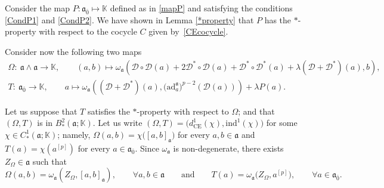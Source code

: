 \documentclass[pdftex]{sigma}
\numberwithin{equation}{section}
\begin{document}
Consider the map $ P\colon\mathfrak{a}_{\bar 0} \mapsto \mathbb{K} $ defined as in \eqref{mapP} and
satisfying the conditions \eqref{CondP1} and \eqref{CondP2}. We have shown in Lemma \ref{*property} that $P$ has the $*$-property with respect to the cocycle $C$ given by~\eqref{CEcocycle}.

Consider now the following two
maps
\begin{gather*}
\Omega\colon\ \mathfrak{a}\wedge \mathfrak{a} \rightarrow \mathbb K, \qquad (a,b) \mapsto \omega_\mathfrak{a}( {\mathscr D} \circ {\mathscr D}(a) + 2 {\mathscr D}^* \circ {\mathscr D}(a)+ {\mathscr D}^* \circ {\mathscr D}^*(a) +\lambda ( {\mathscr D} + {\mathscr D} ^* )(a) , b) , \\
T\colon\ \mathfrak{a}_{\bar 0} \rightarrow \mathbb K, \qquad a \mapsto \omega_\mathfrak{a}(({\mathscr D}+{\mathscr D}^*)(a),\bigl(\mathrm{ad}_a^\mathfrak{a}\bigr)^{p-2}({\mathscr D}(a)))+\lambda P(a).
\end{gather*}

Let us suppose that $T$ satisfies the $*$-property with respect to $\Omega$; and that $(\Omega, T)$ is in $B^2_*(\mathfrak{a};\mathbb{K})$.
Let us write $(\Omega, T)= \bigl(d^1_{\mathrm{CE}} (\chi), \mathrm{ind}^1(\chi) \bigr)$ for some $\chi\in C^1_*(\mathfrak{a}; \mathbb{K})$; namely, $\Omega(a,b)=\chi\bigl([a,b]_\mathfrak{a}\bigr)$ for every $a,b\in \mathfrak{a}$ and $T(a)=\chi(a^{[p]})$ for every $a\in \mathfrak{a}_{\bar 0}$.
 Since $\omega_\mathfrak{a}$ is non-degenerate, there exists~$Z_\Omega\in \mathfrak{a}$ such that
\begin{equation}
\label{Eazero}
\Omega(a,b)=\omega_\mathfrak{a}(Z_\Omega,[a,b]_\mathfrak{a}),\qquad \forall a,b\in \mathfrak{a} \qquad \text{and} \qquad T(a)=\omega_\mathfrak{a}\bigl(Z_\Omega,a^{[p]}\bigr), \qquad \forall a\in \mathfrak{a}_{\bar 0}.
\end{equation}
\end{document}
